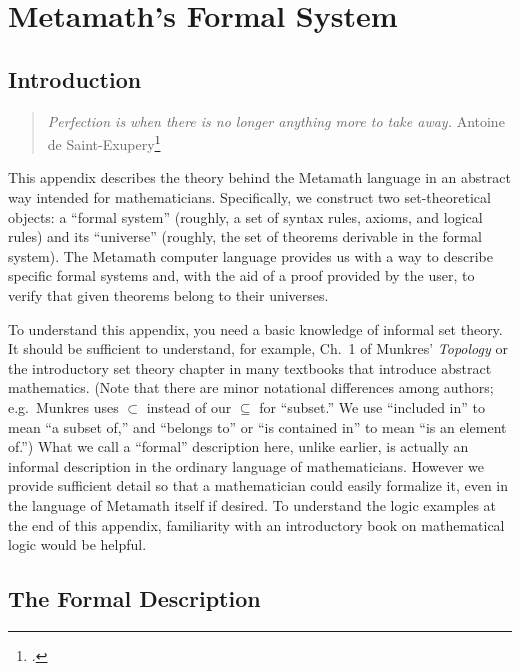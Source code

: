 \chapter{Metamath's Formal System}\label{formalspec}

\section{Introduction}

\begin{quote}
  {\em Perfection is when there is no longer anything more to take away.}
    \flushright\sc Antoine de
     Saint-Exupery\footnote{\cite[p.~3-25]{Campbell}.}\\
\end{quote}

This appendix describes the theory behind the Metamath language in an abstract
way intended for mathematicians.  Specifically, we construct two
set-theo\-ret\-i\-cal objects:  a ``formal system'' (roughly, a set of syntax
rules, axioms, and logical rules) and its ``universe'' (roughly, the set of
theorems derivable in the formal system).  The Metamath computer language
provides us with a way to describe specific formal systems and, with the aid of
a proof provided by the user, to verify that given theorems
belong to their universes.

To understand this appendix, you need a basic knowledge of informal set theory.
It should be sufficient to understand, for example, Ch.\ 1 of Munkres' {\em
Topology} \cite{Munkres} or the
introductory set theory chapter
in many textbooks that introduce abstract mathematics. (Note that there are
minor notational differences among authors; e.g.\ Munkres uses $\subset$ instead
of our $\subseteq$ for ``subset.''  We use ``included in'' to mean ``a subset
of,'' and ``belongs to'' or ``is contained in'' to mean ``is an element of.'')
What we call a ``formal'' description here, unlike earlier, is actually an
informal description in the ordinary language of mathematicians.  However we
provide sufficient detail so that a mathematician could easily formalize it,
even in the language of Metamath itself if desired.  To understand the logic
examples at the end of this appendix, familiarity with an introductory book on
mathematical logic would be helpful.

\section{The Formal Description}

